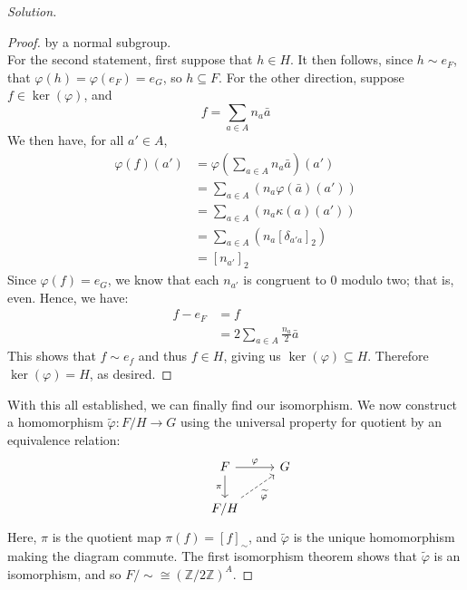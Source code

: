 \documentclass[12pt]{article}
\newenvironment{solution}
  {\renewcommand\qedsymbol{$\blacksquare$}\begin{proof}[Solution]}
{\end{proof}}
\newenvironment{sproof}{
  \renewcommand\qedsymbol{$\square$}
  \begin{proof}
  }{
  \end{proof}
}
\begin{document}
\begin{solution}
\begin{sproof}
    by a normal subgroup. \\
    For the second statement, first suppose that $h\in H$. 
    It then follows, since $h\sim e_F$, that $\varphi(h) = \varphi(e_F) = e_G$, so $h\subseteq F$.
    For the other direction, suppose $f\in\ker(\varphi)$, and 
    \begin{equation*}
      f = \sum_{a\in A} n_a \bar{a}
    \end{equation*}
    We then have, for all $a'\in A$,
    \begin{align*}
      \varphi(f)(a') &= \varphi\left( \sum_{a\in A} n_a\bar{a} \right)(a') \\
      &= \sum_{a\in A}\left( n_a\varphi(\bar{a})(a') \right) \\
      &= \sum_{a\in A}\left( n_a\kappa(a)(a') \right) \\
      &= \sum_{a\in A}\left( n_a[\delta_{a'a}]_2 \right) \\
      &= [n_{a'}]_2
    \end{align*}
    Since $\varphi(f) = e_G$, we know that each $n_{a'}$ is congruent to 0 modulo two; that is, even.
    Hence, we have:
    \begin{align*}
      f - e_F &= f \\
      &= 2\sum_{a\in A} \frac{n_a}{2} \bar{a}
    \end{align*}
    This shows that $f\sim e_f$ and thus $f \in H$, giving us $\ker(\varphi)\subseteq H$.
    Therefore $\ker(\varphi) = H$, as desired.
  \end{sproof}
  With this all established, we can finally find our isomorphism.
  We now construct a homomorphism 
  $\widetilde{\varphi} : F/H\to G$ using the universal property for quotient by an equivalence relation:
  \[\begin{tikzcd}
      & F \ar{d}[swap]{\pi} \ar{r}{\varphi} & G \\
    & F/H \ar[dashed]{ur}[swap]{\widetilde{\varphi}} &
  \end{tikzcd}\]
  Here, $\pi$ is the quotient map $\pi(f) = [f]_{\sim}$, and $\widetilde{\varphi}$ is the unique homomorphism
  making the diagram commute.
  The first isomorphism theorem shows that $\widetilde{\varphi}$ is an isomorphism,
  and so $F/{\sim} \cong (\mathbb{Z}/2\mathbb{Z})^A$.
\end{solution}
\end{document}

